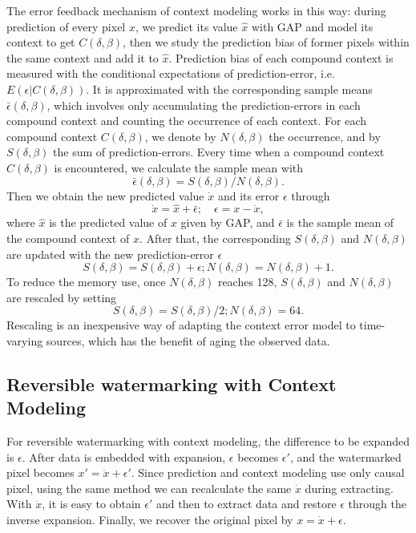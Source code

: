 \documentclass[journal]{IEEEtran}
\begin{document}
The error feedback mechanism of context modeling works in this way: during prediction of every pixel
$x$, we predict its value $\hat{x}$ with GAP and model its context to get $C(\delta, \beta)$, then
we study the prediction bias of former pixels within the same context and add it to $\hat{x}$.
Prediction bias of each compound context is measured with the conditional expectations of
prediction-error, i.e.\ $E(\epsilon|C(\delta, \beta))$. It is approximated with the corresponding
sample means $\bar{\epsilon}(\delta, \beta)$, which involves only accumulating the prediction-errors
in each compound context and counting the occurrence of each context. For each compound context
$C(\delta, \beta)$, we denote by $N(\delta, \beta)$ the occurrence, and by $S(\delta, \beta)$ the
sum of prediction-errors. Every time when a compound context $C(\delta, \beta)$ is encountered, we
calculate the sample mean with 
\begin{equation}\label{eqn:meanerr}
    \bar{\epsilon}(\delta, \beta) = S(\delta, \beta)/N(\delta, \beta).
\end{equation}
Then we obtain the new predicted value $\dot{x}$ and its error $\epsilon$ through
\begin{equation}\label{eqn:errfdb}
    \dot{x} = \hat{x} + \bar{\epsilon}; \quad \epsilon = x - \dot{x}, 
\end{equation}
where $\hat{x}$ is the predicted value of $x$ given by GAP, and $\bar{\epsilon}$ is the sample mean
of the compound context of $x$. After that, the corresponding $S(\delta, \beta)$ and $N(\delta,
\beta)$ are updated with the new prediction-error $\epsilon$
\begin{equation}\label{eqn:varupt}
    S(\delta, \beta) = S(\delta, \beta) + \epsilon; N(\delta, \beta) = N(\delta, \beta) + 1.
\end{equation}
To reduce the memory use, once $N(\delta, \beta)$ reaches 128, $S(\delta, \beta)$ and $N(\delta,
\beta)$ are rescaled by setting
\begin{equation}\label{eqn:rescale}
    S(\delta, \beta) = S(\delta, \beta)/2; N(\delta, \beta) = 64.
\end{equation}
Rescaling is an inexpensive way of adapting the context error model to time-varying sources, which
has the benefit of aging the observed data. 

\subsection{Reversible watermarking with Context Modeling}
For reversible watermarking with context modeling, the difference to be expanded is $\epsilon$.
After data is embedded with expansion, $\epsilon$ becomes $\epsilon'$, and the watermarked pixel
becomes $x' = \dot{x} + \epsilon'$. Since prediction and context modeling use only causal pixel,
using the same method we can recalculate the same $\dot{x}$ during extracting. With $\dot{x}$, it is
easy to obtain $\epsilon'$ and then to extract data and restore $\epsilon$ through the inverse
expansion. Finally, we recover the original pixel by $x = \dot{x} + \epsilon$. 
\end{document}
